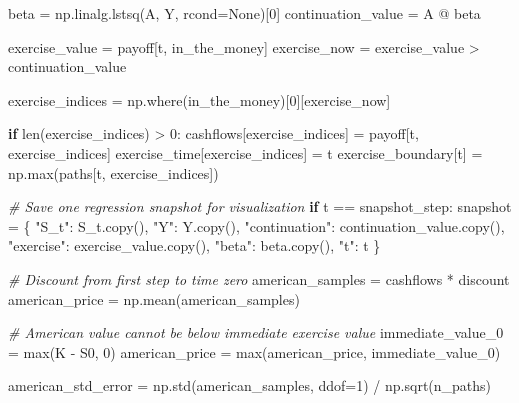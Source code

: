 \documentclass[
  11pt,
]{article}
\newenvironment{Shaded}{}{}
\newcommand{\BuiltInTok}[1]{\textcolor[rgb]{0.00,0.50,0.00}{#1}}
\newcommand{\CommentTok}[1]{\textcolor[rgb]{0.38,0.63,0.69}{\textit{#1}}}
\newcommand{\ControlFlowTok}[1]{\textcolor[rgb]{0.00,0.44,0.13}{\textbf{#1}}}
\newcommand{\DecValTok}[1]{\textcolor[rgb]{0.25,0.63,0.44}{#1}}
\newcommand{\NormalTok}[1]{#1}
\newcommand{\OperatorTok}[1]{\textcolor[rgb]{0.40,0.40,0.40}{#1}}
\newcommand{\StringTok}[1]{\textcolor[rgb]{0.25,0.44,0.63}{#1}}
\newcommand{\VariableTok}[1]{\textcolor[rgb]{0.10,0.09,0.49}{#1}}
\begin{document}
\begin{Shaded}
\begin{Highlighting}[]
\NormalTok{        beta }\OperatorTok{=}\NormalTok{ np.linalg.lstsq(A, Y, rcond}\OperatorTok{=}\VariableTok{None}\NormalTok{)[}\DecValTok{0}\NormalTok{]}
\NormalTok{        continuation\_value }\OperatorTok{=}\NormalTok{ A }\OperatorTok{@}\NormalTok{ beta}

\NormalTok{        exercise\_value }\OperatorTok{=}\NormalTok{ payoff[t, in\_the\_money]}
\NormalTok{        exercise\_now }\OperatorTok{=}\NormalTok{ exercise\_value }\OperatorTok{\textgreater{}}\NormalTok{ continuation\_value}

\NormalTok{        exercise\_indices }\OperatorTok{=}\NormalTok{ np.where(in\_the\_money)[}\DecValTok{0}\NormalTok{][exercise\_now]}

        \ControlFlowTok{if} \BuiltInTok{len}\NormalTok{(exercise\_indices) }\OperatorTok{\textgreater{}} \DecValTok{0}\NormalTok{:}
\NormalTok{            cashflows[exercise\_indices] }\OperatorTok{=}\NormalTok{ payoff[t, exercise\_indices]}
\NormalTok{            exercise\_time[exercise\_indices] }\OperatorTok{=}\NormalTok{ t}
\NormalTok{            exercise\_boundary[t] }\OperatorTok{=}\NormalTok{ np.}\BuiltInTok{max}\NormalTok{(paths[t, exercise\_indices])}

        \CommentTok{\# Save one regression snapshot for visualization}
        \ControlFlowTok{if}\NormalTok{ t }\OperatorTok{==}\NormalTok{ snapshot\_step:}
\NormalTok{            snapshot }\OperatorTok{=}\NormalTok{ \{}
                \StringTok{"S\_t"}\NormalTok{: S\_t.copy(),}
                \StringTok{"Y"}\NormalTok{: Y.copy(),}
                \StringTok{"continuation"}\NormalTok{: continuation\_value.copy(),}
                \StringTok{"exercise"}\NormalTok{: exercise\_value.copy(),}
                \StringTok{"beta"}\NormalTok{: beta.copy(),}
                \StringTok{"t"}\NormalTok{: t}
\NormalTok{            \}}

\CommentTok{\# Discount from first step to time zero}
\NormalTok{american\_samples }\OperatorTok{=}\NormalTok{ cashflows }\OperatorTok{*}\NormalTok{ discount}
\NormalTok{american\_price }\OperatorTok{=}\NormalTok{ np.mean(american\_samples)}

\CommentTok{\# American value cannot be below immediate exercise value}
\NormalTok{immediate\_value\_0 }\OperatorTok{=} \BuiltInTok{max}\NormalTok{(K }\OperatorTok{{-}}\NormalTok{ S0, }\DecValTok{0}\NormalTok{)}
\NormalTok{american\_price }\OperatorTok{=} \BuiltInTok{max}\NormalTok{(american\_price, immediate\_value\_0)}

\NormalTok{american\_std\_error }\OperatorTok{=}\NormalTok{ np.std(american\_samples, ddof}\OperatorTok{=}\DecValTok{1}\NormalTok{) }\OperatorTok{/}\NormalTok{ np.sqrt(n\_paths)}


\end{Highlighting}
\end{Shaded}
\end{document}

